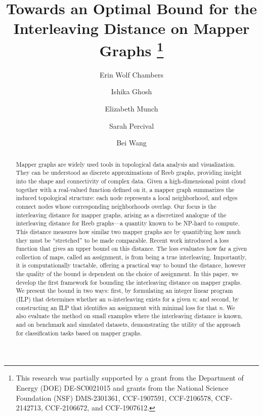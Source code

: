 \documentclass[english,a4paper,cleveref,nosubfigcap, nolineno, thm-restate]{socg-lipics-v2021}
\title{Towards an Optimal Bound for the Interleaving Distance on Mapper Graphs 
\thanks{This research was partially supported by a grant from the Department of Energy (DOE) DE-SC0021015 and grants from the National Science Foundation (NSF) DMS-2301361, CCF-1907591, CCF-2106578, CCF-2142713, CCF-2106672, and CCF-1907612.}
}
\author{Erin Wolf Chambers}{ University of Notre Dame, USA}{echambe2@nd.dot.edu}{https://orcid.org/0000-0001-8333-3676}{}
\author{Ishika Ghosh}{Michigan State University, USA}{ghoshis3@msu.edu}{https://orcid.org/0000-0002-7901-5912}{}
\author{Elizabeth Munch}{Michigan State University, USA}{muncheli@msu.edu}{https://orcid.org/0000-0002-9459-9493}{}
\author{Sarah Percival}{University of New Mexico, USA}{spercival@msu.edu}{https://orcid.org/0000-0003-1024-4618}{}
\author{Bei Wang}{University of Utah, USA}{beiwang@sci.utah.edu}{https://orcid.org/0000-0002-9240-0700}{}
\date{}
\newcommand{\1}{\mathbbm{1}}
\begin{document}
\maketitle

\begin{abstract}
Mapper graphs are widely used tools in topological data analysis and visualization. They can be understood as discrete approximations of Reeb graphs, providing insight into the shape and connectivity of complex data. Given a high-dimensional point cloud together with a real-valued function defined on it, a mapper graph summarizes the induced topological structure: each node represents a local neighborhood, and edges connect nodes whose corresponding neighborhoods overlap. Our focus is the interleaving distance for mapper graphs, arising as a discretized analogue of the interleaving distance for Reeb graphs—a quantity known to be NP-hard to compute. This distance measures how similar two mapper graphs are by quantifying how much they must be ``stretched'' to be made comparable. Recent work introduced a loss function that gives an upper bound on this distance. The loss evaluates how far a given collection of maps, called an assignment, is from being a true interleaving. Importantly, it is computationally tractable, offering a practical way to bound the distance, however the quality of the bound is dependent on the choice of assignment.
In this paper, we develop the first framework for bounding the interleaving distance on mapper graphs. We present the bound in two ways: first, by formulating an integer linear program (ILP) that determines whether an $n$-interleaving exists for a given $n$; and second, by constructing an ILP that identifies an assignment with minimal loss for that $n$.
We also evaluate the method on small examples where the interleaving distance is known, and on benchmark and simulated datasets, demonstrating the utility of the approach for classification tasks based on mapper graphs.

\end{abstract}











\appendix
   
\end{document}

